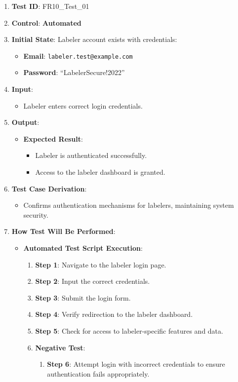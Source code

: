 \documentclass[12pt, titlepage]{article}
\begin{document}
\begin{enumerate}
    \item \textbf{Test ID}: FR10\_Test\_01
    \item \textbf{Control}: \textbf{Automated}
    \item \textbf{Initial State}: Labeler account exists with credentials:
    \begin{itemize}
        \item \textbf{Email}: \texttt{labeler.test@example.com}
        \item \textbf{Password}: ``LabelerSecure!2022''
    \end{itemize}
    \item \textbf{Input}:
    \begin{itemize}
        \item Labeler enters correct login credentials.
    \end{itemize}
    \item \textbf{Output}:
    \begin{itemize}
        \item \textbf{Expected Result}:
        \begin{itemize}
            \item Labeler is authenticated successfully.
            \item Access to the labeler dashboard is granted.
        \end{itemize}
    \end{itemize}
    \item \textbf{Test Case Derivation}:
    \begin{itemize}
        \item Confirms authentication mechanisms for labelers, maintaining system security.
    \end{itemize}
    \item \textbf{How Test Will Be Performed}:
    \begin{itemize}
        \item \textbf{Automated Test Script Execution}:
        \begin{enumerate}
            \item \textbf{Step 1}: Navigate to the labeler login page.
            \item \textbf{Step 2}: Input the correct credentials.
            \item \textbf{Step 3}: Submit the login form.
            \item \textbf{Step 4}: Verify redirection to the labeler dashboard.
            \item \textbf{Step 5}: Check for access to labeler-specific features and data.
            \item \textbf{Negative Test}:
            \begin{enumerate}
                \item \textbf{Step 6}: Attempt login with incorrect credentials to ensure authentication fails appropriately.
            \end{enumerate}
        \end{enumerate}
    \end{itemize}
\end{enumerate}
\end{document}
